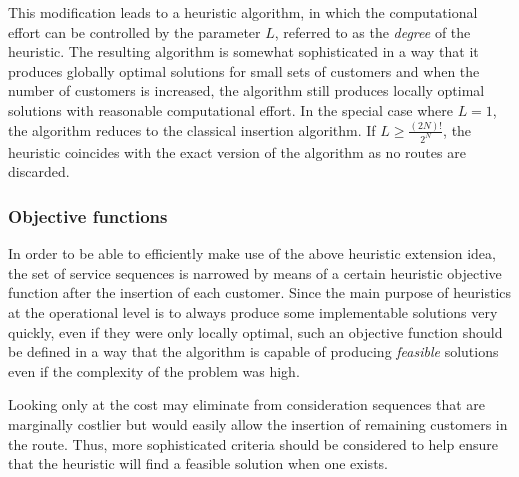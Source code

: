 \documentclass[dissertation,draft*]{aaltoseries}
\begin{document}
This modification leads to a heuristic algorithm, in which the computational
effort can be controlled by the parameter $L$, referred to as the \emph{degree} of
the heuristic. The resulting algorithm is
somewhat sophisticated in a way that it produces globally optimal solutions for
small sets of customers and when the number of customers is increased, the
algorithm still produces locally optimal solutions with 
reasonable computational effort. In the special case where $L=1$, the
algorithm reduces to the classical insertion algorithm. 
If $L \geq \frac{(2N)!}{2^N}$, the heuristic coincides with the exact version of the 
algorithm as no routes are discarded.

\subsubsection{Objective functions}
\label{hobjfunc}
In order to be able to efficiently make use of the above heuristic extension
idea, the set of service sequences is narrowed by means of a certain heuristic objective function
after the insertion of each customer.
Since the main purpose of heuristics at the operational level is to always produce some implementable 
solutions very quickly, even if they were only locally optimal, such an objective function should 
be defined in a way that the algorithm is 
capable of producing \emph{feasible} solutions even if the complexity of the problem was high. %

Looking only at the cost may eliminate from consideration
sequences that are marginally costlier but would easily allow the
insertion of remaining customers in the route. 
Thus, more sophisticated criteria should be considered to help ensure that the heuristic will
find a feasible solution when one exists.
\end{document}
